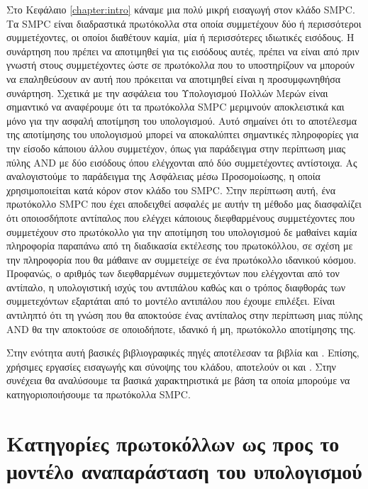 Στο Κεφάλαιο \ref{chapter:intro} κάναμε μια πολύ μικρή εισαγωγή στον κλάδο SMPC. Τα SMPC είναι διαδραστικά πρωτόκολλα στα οποία συμμετέχουν δύο ή περισσότεροι συμμετέχοντες, οι οποίοι διαθέτουν καμία, μία ή περισσότερες ιδιωτικές εισόδους. Η συνάρτηση που πρέπει να αποτιμηθεί για τις εισόδους αυτές, πρέπει να είναι από πριν γνωστή στους συμμετέχοντες ώστε σε πρωτόκολλα που το υποστηρίζουν να μπορούν να επαληθεύσουν αν αυτή που πρόκειται να αποτιμηθεί είναι η προσυμφωνηθήσα συνάρτηση. Σχετικά με την ασφάλεια του Υπολογισμού Πολλών Μερών είναι σημαντικό να αναφέρουμε ότι τα πρωτόκολλα SMPC μεριμνούν αποκλειστικά και μόνο για την ασφαλή αποτίμηση του υπολογισμού. Αυτό σημαίνει ότι το αποτέλεσμα της αποτίμησης του υπολογισμού μπορεί να αποκαλύπτει σημαντικές πληροφορίες για την είσοδο κάποιου άλλου συμμετέχον, όπως για παράδειγμα στην περίπτωση μιας πύλης AND με δύο εισόδους όπου ελέγχονται από δύο συμμετέχοντες αντίστοιχα. Ας αναλογιστούμε το παράδειγμα της Ασφάλειας μέσω Προσομοίωσης, η οποία χρησιμοποιείται κατά κόρον στον κλάδο του SMPC. Στην περίπτωση αυτή, ένα πρωτόκολλο SMPC που έχει αποδειχθεί ασφαλές με αυτήν τη μέθοδο μας διασφαλίζει ότι οποιοσδήποτε αντίπαλος που ελέγχει κάποιους διεφθαρμένους συμμετέχοντες που συμμετέχουν στο πρωτόκολλο για την αποτίμηση του υπολογισμού δε μαθαίνει καμία πληροφορία παραπάνω από τη διαδικασία εκτέλεσης του πρωτοκόλλου, σε σχέση με την πληροφορία που θα μάθαινε αν συμμετείχε σε ένα πρωτόκολλο ιδανικού κόσμου. Προφανώς, ο αριθμός των διεφθαρμένων συμμετεχόντων που ελέγχονται από τον αντίπαλο, η υπολογιστική ισχύς του αντιπάλου καθώς και ο τρόπος διαφθοράς των συμμετεχόντων εξαρτάται από το μοντέλο αντιπάλου που έχουμε επιλέξει. Είναι αντιληπτό ότι τη γνώση που θα αποκτούσε ένας αντίπαλος στην περίπτωση μιας πύλης AND θα την αποκτούσε σε οποιοδήποτε, ιδανικό ή μη, πρωτόκολλο αποτίμησης της.

Στην ενότητα αυτή βασικές βιβλιογραφικές πηγές αποτέλεσαν τα βιβλία \cite{10.1561/3300000019} και \cite{cramer2015secure}. Επίσης, χρήσιμες εργασίες εισαγωγής και σύνοψης του κλάδου, αποτελούν οι \cite{cryptoeprint:2020/300} και  \cite{zhao2019secure}. Στην συνέχεια θα αναλύσουμε τα βασικά χαρακτηριστικά με βάση τα οποία μπορούμε να κατηγοριοποιήσουμε τα πρωτόκολλα SMPC.

\section{Κατηγορίες πρωτοκόλλων ως προς το μοντέλο αναπαράσταση του υπολογισμού}


